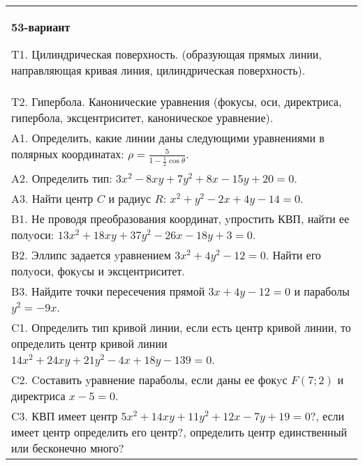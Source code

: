 \documentclass{article}
\begin{document}
\begin{tabular}{m{17cm}}
\textbf{53-вариант}
\newline

T1. Цилиндрическая поверхность. (образующая прямых линии, направляющая кривая линия, цилиндрическая поверхность).\\

T2. Гипербола. Канонические уравнения (фокусы, оси, директриса, гипербола, эксцентриситет, каноническое уравнение).\\

A1. Определить, какие линии даны следующими уравнениями в полярных координатах: $\rho=\frac{5}{1-\frac{1}{2}\cos\theta}$.\\

A2. Определить тип: $3x^{2}-8xy+7y^{2}+8x-15y+20=0$.\\

A3. Найти центр $C$ и радиус $R$: $x^2+y^2-2x+4y-14=0$.\\

B1. Не проводя преобразования координат, yпростить КВП, найти ее полyоси: $13x^{2} + 18xy + 37y^{2} - 26x - 18y + 3 = 0$.  \\

B2. Эллипс задается yравнением $3x^{2} + 4y^{2} - 12 = 0$. Найти его полyоси, фокyсы и эксцентриситет.  \\

B3. Найдите точки пересечения прямой $3x + 4y - 12 = 0$ и параболы $y^{2} = - 9x$.  \\

C1. Определить тип кривой линии, если есть центр кривой линии, то определить центр кривой линии $14x^{2}+24xy+21y^{2}-4x+18y-139=0$.  \\

C2. Cоставить yравнение параболы, если даны ее фокyс $F(7;2)$ и директриса $x-5=0$.  \\

C3. КВП имеет центр $5x^{2}+14xy+11y^{2}+12x-7y+19=0$?, если имеет центр определить его центр?, определить центр единственный или бесконечно много?  \\

\end{tabular}
\vspace{1cm}
\end{document}
